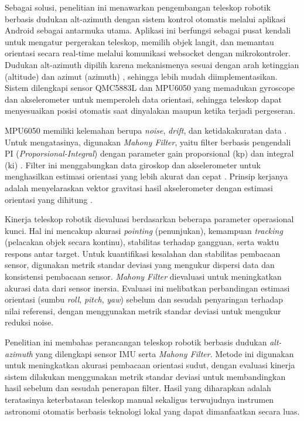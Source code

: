 Sebagai solusi, penelitian ini menawarkan pengembangan teleskop robotik berbasis dudukan alt-azimuth dengan sistem kontrol otomatis melalui aplikasi Android sebagai antarmuka utama. Aplikasi ini berfungsi sebagai pusat kendali untuk mengatur pergerakan teleskop, memilih objek langit, dan memantau orientasi secara real-time melalui komunikasi websocket dengan mikrokontroler. Dudukan alt-azimuth dipilih karena mekanismenya sesuai dengan arah ketinggian (altitude) dan azimut (azimuth) \cite{Bradley2014} \cite{Roy2018}, sehingga lebih mudah diimplementasikan. Sistem dilengkapi sensor QMC5883L dan MPU6050 yang memadukan gyroscope dan akselerometer untuk memperoleh data orientasi, sehingga teleskop dapat menyesuaikan posisi otomatis saat dinyalakan maupun ketika terjadi pergeseran.

MPU6050 memiliki kelemahan berupa \textit{noise}, \textit{drift}, dan ketidakakuratan data \cite{Alfian2021}. Untuk mengatasinya, digunakan \textit{Mahony Filter}, yaitu filter berbasis pengendali PI (\textit{Proporsional-Integral}) dengan parameter gain proporsional (kp) dan integral (ki) \cite{Brndle2025}. Filter ini menggabungkan data giroskop dan akselerometer untuk menghasilkan estimasi orientasi yang lebih akurat dan cepat \cite{SimoneALudwigA2018} \cite{SimoneALudwig2018}. Prinsip kerjanya adalah menyelaraskan vektor gravitasi hasil akselerometer dengan estimasi orientasi yang dihitung \cite{Brndle2025} \cite{SivaSivamani2024}.

Kinerja teleskop robotik dievaluasi berdasarkan beberapa parameter operasional kunci. Hal ini mencakup akurasi \textit{pointing} (penunjukan), kemampuan \textit{tracking} (pelacakan objek secara kontinu), stabilitas terhadap gangguan, serta waktu respons antar target. Untuk kuantifikasi kesalahan dan stabilitas pembacaan sensor, digunakan metrik standar deviasi yang mengukur dispersi data dan konsistensi pembacaan sensor. \textit{Mahony Filter} dievaluasi untuk meningkatkan akurasi data dari sensor inersia. Evaluasi ini melibatkan perbandingan estimasi orientasi (sumbu \textit{roll}, \textit{pitch}, \textit{yaw}) sebelum dan sesudah penyaringan terhadap nilai referensi, dengan menggunakan metrik standar deviasi untuk mengukur reduksi noise.

Penelitian ini membahas perancangan teleskop robotik berbasis dudukan \textit{alt-azimuth} yang dilengkapi sensor IMU serta \textit{Mahony Filter}. Metode ini digunakan untuk meningkatkan akurasi pembacaan orientasi sudut, dengan evaluasi kinerja sistem dilakukan menggunakan metrik standar deviasi untuk membandingkan hasil sebelum dan sesudah penerapan filter. Hasil yang diharapkan adalah teratasinya keterbatasan teleskop manual sekaligus terwujudnya instrumen astronomi otomatis berbasis teknologi lokal yang dapat dimanfaatkan secara luas.

